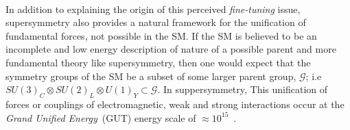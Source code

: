 \paragraph*{}
In addition to explaining the origin of this perceived \textit{fine-tuning} issue, supersymmetry also provides a natural framework for the unification of fundamental forces, not possible in the SM.
If the SM is believed to be an incomplete and low energy description of nature of a possible parent and more fundamental theory like supersymmetry, then one would expect that the symmetry groups of the SM be a subset of some larger parent group, $\mathcal{G}$; i.e $\displaystyle{SU(3)_{C} \otimes SU(2)_{L} \otimes U(1)_{Y} \subset \mathcal{G}}$.
In suppersymmetry, This unification of forces or couplings of electromagnetic, weak and strong interactions occur at the \textit{Grand Unified Energy}~(GUT) energy scale of $\approx 10^{15}$~\GeV \cite{SM}.

\clearpage

